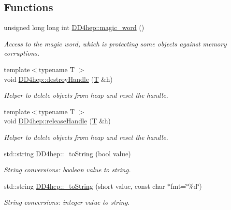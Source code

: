 \subsection*{Functions}
\begin{DoxyCompactItemize}
\item 
unsigned long long int \hyperlink{group___d_d4_h_e_p___g_e_o_m_e_t_r_y_ga2410a636084da38b545f3774a04705be}{D\+D4hep\+::magic\+\_\+word} ()
\begin{DoxyCompactList}\small\item\em Access to the magic word, which is protecting some objects against memory corruptions. \end{DoxyCompactList}\item 
{\footnotesize template$<$typename T $>$ }\\void \hyperlink{group___d_d4_h_e_p___g_e_o_m_e_t_r_y_gafdf7bdfc33b97172b15a9a953b460046}{D\+D4hep\+::destroy\+Handle} (\hyperlink{class_t}{T} \&h)
\begin{DoxyCompactList}\small\item\em Helper to delete objects from heap and reset the handle. \end{DoxyCompactList}\item 
{\footnotesize template$<$typename T $>$ }\\void \hyperlink{group___d_d4_h_e_p___g_e_o_m_e_t_r_y_ga46c1fbec061f190478c98deef29382ef}{D\+D4hep\+::release\+Handle} (\hyperlink{class_t}{T} \&h)
\begin{DoxyCompactList}\small\item\em Helper to delete objects from heap and reset the handle. \end{DoxyCompactList}\item 
std\+::string \hyperlink{group___d_d4_h_e_p___g_e_o_m_e_t_r_y_gaf0b4c8d8a6efc966a3609c4594448050}{D\+D4hep\+::\+\_\+to\+String} (bool value)
\begin{DoxyCompactList}\small\item\em String conversions\+: boolean value to string. \end{DoxyCompactList}\item 
std\+::string \hyperlink{group___d_d4_h_e_p___g_e_o_m_e_t_r_y_ga33b8273e6b24bc97470fb7681a071e5f}{D\+D4hep\+::\+\_\+to\+String} (short value, const char $\ast$fmt=\char`\"{}\%d\char`\"{})
\begin{DoxyCompactList}\small\item\em String conversions\+: integer value to string. \end{DoxyCompactList}\item 

\end{DoxyCompactItemize}

